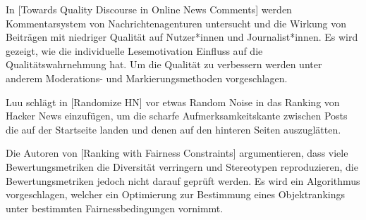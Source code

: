 In [Towards Quality Discourse in Online News Comments]  werden Kommentarsystem von Nachrichtenagenturen untersucht und die Wirkung von Beiträgen mit niedriger Qualität auf Nutzer*innen und Journalist*innen. Es wird gezeigt, wie die individuelle Lesemotivation Einfluss auf die Qualitätswahrnehmung hat. Um die Qualität zu verbessern werden unter anderem Moderations- und Markierungsmethoden vorgeschlagen.

Luu schlägt in [Randomize HN] vor etwas Random Noise in das Ranking von Hacker News einzufügen, um die scharfe Aufmerksamkeitskante zwischen Posts die auf der Startseite landen und denen auf  den hinteren Seiten auszuglätten.

Die Autoren von [Ranking with Fairness Constraints] argumentieren, dass viele Bewertungsmetriken die Diversität verringern und Stereotypen reproduzieren, die Bewertungsmetriken jedoch nicht darauf geprüft werden. Es wird ein Algorithmus vorgeschlagen, welcher ein Optimierung zur Bestimmung eines Objektrankings unter bestimmten Fairnessbedingungen vornimmt.









